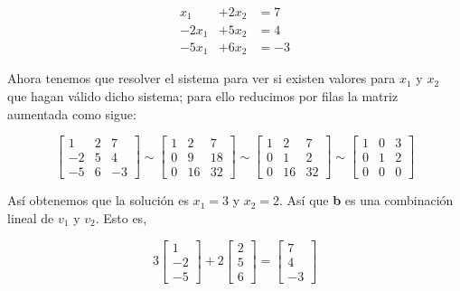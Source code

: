 \documentclass{article}
\begin{document}
\begin{equation*}
    \begin{array}{ccc}
        x_1 &+ 2x_2 &= 7\\
        -2x_1 &+ 5x_2 &= 4\\
        -5x_1 &+ 6x_2 &= -3
    \end{array}
\end{equation*}

Ahora tenemos que resolver el sistema para ver si existen valores para $x_1$ y $x_2$ que hagan válido dicho sistema; para ello reducimos por filas la matriz aumentada como sigue:

\begin{equation}
    \left[\begin{array}{rr|r}
    1 & 2 & 7 \\
    -2 & 5 & 4 \\
    -5 & 6 & -3
    \end{array}\right] \sim\left[\begin{array}{rr|r}
    1 & 2 & 7 \\
    0 & 9 & 18 \\
    0 & 16 & 32
    \end{array}\right] \sim\left[\begin{array}{rr|r}
    1 & 2 & 7 \\
    0 & 1 & 2 \\
    0 & 16 & 32
    \end{array}\right] \sim\left[\begin{array}{ll|l}
    1 & 0 & 3 \\
    0 & 1 & 2 \\
    0 & 0 & 0
    \end{array}\right]
\end{equation}

Así obtenemos que la solución es $x_1 = 3$ y $x_2 = 2$. Así que \textbf{b} es una combinación lineal de \textbf{$v_1$} y \textbf{$v_2$}. Esto es, 

\begin{equation*}
    3 \begin{bmatrix}
        1\\-2\\-5
    \end{bmatrix} 
    +2 \begin{bmatrix}
        2\\5\\6
    \end{bmatrix}
    = \begin{bmatrix}
        7\\4\\-3
    \end{bmatrix}
\end{equation*}
\end{document}
